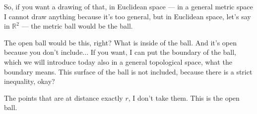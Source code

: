 \begin{speech}[00:03:54 - 00:04:52]
So, if you want a drawing of that, in Euclidean space --- in a general metric space I cannot draw anything because it's too general, but in Euclidean space, let's say in $\mathbb{R}^2$  --- the metric ball would be the ball.

The open ball would be this, right?  What is inside of the ball. And it's open because you don't include... If you want, I can put the boundary of the ball, which we will introduce today also in a general topological space, what the boundary means. This surface of the ball is not included, because there is a strict inequality, okay?

The points that are at distance exactly $r$, I don't take them. This is the open ball.
\end{speech}

